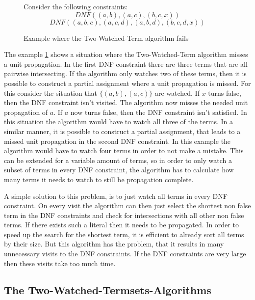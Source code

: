 \begin{figure}[!htb]
\begin{leftbar}
Consider the following constraints:
\begin{displaymath}
DNF ((a,b),(a,c),(b,c,x))
\end{displaymath}
\begin{displaymath}
DNF ((a,b,c),(a,c,d),(a,b,d),(b,c,d,x))
\end{displaymath}
\end{leftbar}
\caption{Example where the Two-Watched-Term algorithm fails}
\label{ex:NotPropagationComplete}
\end{figure}

The example \ref{ex:NotPropagationComplete} shows a situation where the Two-Watched-Term algorithm misses a unit propagation. In the first DNF constraint there are three terms that are all pairwise intersecting. If the algorithm only watches two of these terms, then it is possible to construct a partial assignment where a unit propagation is missed. For this consider the situation that $\{(a,b),(a,c)\}$ are watched. If $x$ turns false, then the DNF constraint isn't visited. The algorithm now misses the needed unit propagation of $a$. If $a$ now turns false, then the DNF constraint isn't satisfied. In this situation the algorithm would have to watch all three of the terms.
In a similar manner, it is possible to construct a partial assignment, that leads to a missed unit propagation in the second DNF constraint. In this example the algorithm would have to watch four terms in order to not make a mistake. This can be extended for a variable amount of terms, so in order to only watch a subset of terms in every DNF constraint, the algorithm has to calculate how many terms it needs to watch to still be propagation complete. 

A simple solution to this problem, is to just watch all terms in every DNF constraint.
On every visit the algorithm can then just select the shortest non false term in the DNF constraints and check for intersections with all other non false terms. If there exists such a literal then it needs to be propagated. In order to speed up the search for the shortest term, it is efficient to already sort all terms by their size. But this algorithm has the problem, that it results in many unnecessary visits to the DNF constraints. If the DNF constraints are very large then these visits take too much time.

\subsection{The Two-Watched-Termsets-Algorithms}

